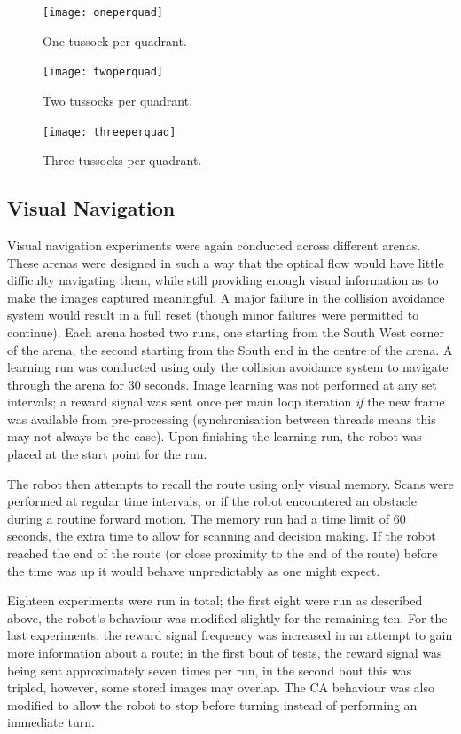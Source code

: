 \documentclass[a4paper,12pt,twoside,openright]{article}
\begin{document}
\begin{figure}[h]
  \centering
  \texttt{[image: oneperquad]}
  \caption{
    \label{fig:oneper} One tussock per quadrant.
  }
\end{figure}
\begin{figure}[h]
  \centering
  \texttt{[image: twoperquad]}
  \caption{
    \label{fig:twoper} Two tussocks per quadrant.
  }
\end{figure}
\begin{figure}[h]
  \centering
  \texttt{[image: threeperquad]}
  \caption{
    \label{fig:threeper} Three tussocks per quadrant.
  }
\end{figure}

\subsection{Visual Navigation}
Visual navigation experiments were again conducted across different arenas. These arenas were designed in such a way that the optical
flow would have little difficulty navigating them, while still providing enough visual information as to make the images captured
meaningful. A major failure in the collision avoidance system would result in a full reset (though minor failures were permitted to
continue). Each arena hosted two runs, one starting from the South West corner of the arena, the second starting from the South end
in the centre of the arena. A learning run was conducted using only the collision avoidance system to navigate through the arena
for 30 seconds. Image learning was not performed at any set intervals; a reward signal was sent once per main loop iteration \textit{if}
the new frame was available from pre-processing (synchronisation between threads means this may not always be the case). Upon finishing
the learning run, the robot was placed at the start point for the run.
\newline

The robot then attempts to recall the route using only visual memory. Scans were performed at regular time intervals, or if the robot
encountered an obstacle during a routine forward motion. The memory run had a time limit of 60 seconds, the extra time to allow for
scanning and decision making. If the robot reached the end of the route (or close proximity to the end of the route) before the time
was up it would behave unpredictably as one might expect.
\newline

Eighteen experiments were run in total; the first eight were run as described above, the robot's behaviour was modified slightly
for the remaining ten. For the last experiments, the reward signal frequency was increased in an attempt to gain more information
about a route; in the first bout of tests, the reward signal was being sent approximately seven times per run, in the second bout
this was tripled, however, some stored images may overlap. The CA behaviour was also modified to allow the robot to stop before
turning instead of performing an immediate turn.
\newline
\end{document}
